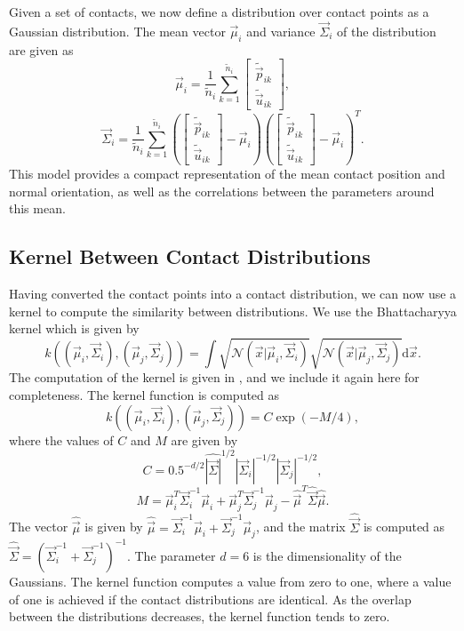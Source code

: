 Given a set of contacts, we now define a distribution over contact
points as a Gaussian distribution. The mean vector $\vec{\mu}_{i}$
and variance $\vec{\Sigma}_{i}$ of the distribution are given as
\[
\vec{\mu}_{i}=\frac{1}{\tilde{n}_{i}}\sum_{k=1}^{\tilde{n}_{i}}\left[\begin{array}{c}
\tilde{\vec{p}}_{ik}\\
\tilde{\vec{u}}_{ik}
\end{array}\right],
\]
\[
\vec{\Sigma}_{i}=\frac{1}{\tilde{n}_{i}}\sum_{k=1}^{\tilde{n}_{i}}\left(\left[\begin{array}{c}
\tilde{\vec{p}}_{ik}\\
\tilde{\vec{u}}_{ik}
\end{array}\right]-\vec{\mu}_{i}\right)\left(\left[\begin{array}{c}
\tilde{\vec{p}}_{ik}\\
\tilde{\vec{u}}_{ik}
\end{array}\right]-\vec{\mu}_{i}\right)^{T}.
\]
This model provides a compact representation of the mean contact position
and normal orientation, as well as the correlations between the parameters
around this mean. 


\subsection{Kernel Between Contact Distributions\label{sub:Comparing-Contact-Distributions}}

Having converted the contact points into a contact distribution, we
can now use a kernel to compute the similarity between distributions.
We use the Bhattacharyya kernel \cite{JebaraK03} which is given
by
\[
k((\vec{\mu}_{i},\vec{\Sigma}_{i}),(\vec{\mu}_{j},\vec{\Sigma}_{j}))=\!\!\int\!\!\!\sqrt{\mathcal{N}(\vec{x}|\vec{\mu}_{i},\vec{\Sigma}_{i})}\sqrt{\mathcal{N}(\vec{x}|\vec{\mu}_{j},\vec{\Sigma}_{j})}\text{d}\vec{x}.
\]
The computation of the kernel is given in \cite{JebaraProbabiltyProductKernels},
and we include it again here for completeness. The kernel function
is computed as
\[
k((\vec{\mu}_{i},\vec{\Sigma}_{i}),(\vec{\mu}_{j},\vec{\Sigma}_{j}))=C\exp\left(-M/4\right),
\]
where the values of $ $$C$ and $M$ are given by
\[
C=0.5^{-d/2}\hat{\left|\vec{\Sigma}\right|}^{1/2}\left|\vec{\Sigma}_{i}\right|^{-1/2}\left|\vec{\Sigma}_{j}\right|^{-1/2},
\]
\[
M=\vec{\mu}_{i}^{T}\vec{\Sigma}_{i}^{-1}\vec{\mu}_{i}+\vec{\mu}_{j}^{T}\vec{\Sigma}_{j}^{-1}\vec{\mu}_{j}-\hat{\vec{\mu}}^{T}\hat{\vec{\Sigma}}\hat{\vec{\mu}}.
\]
 The vector $\hat{\vec{\mu}}$ is given by $\hat{\vec{\mu}}=\vec{\Sigma}_{i}^{-1}\vec{\mu}_{i}+\vec{\Sigma}_{j}^{-1}\vec{\mu}_{j}$,
and the matrix $\hat{\vec{\Sigma}}$ is computed as $\hat{\vec{\Sigma}}=(\vec{\Sigma}_{i}^{-1}+\vec{\Sigma}_{j}^{-1})^{-1}$.
The parameter $d=6$ is the dimensionality of the Gaussians. The kernel
function computes a value from zero to one, where a value of one is
achieved if the contact distributions are identical. As the overlap
between the distributions decreases, the kernel function tends to
zero. 

